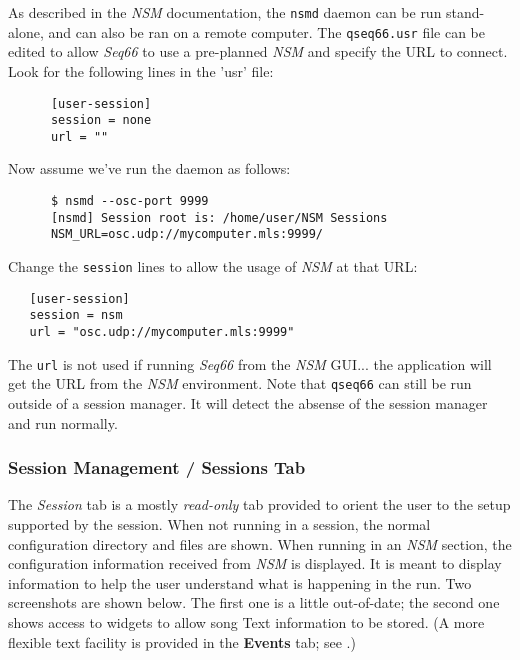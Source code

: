    As described in the \textsl{NSM} documentation, the \texttt{nsmd} daemon can
   be run stand-alone, and can also be ran on a remote computer.
   The \texttt{qseq66.usr} file can be edited to allow \textsl{Seq66} to
   use a pre-planned \textsl{NSM} and specify the URL to connect.
   Look for the following lines in the 'usr' file:

   \begin{verbatim}
      [user-session]
      session = none
      url = ""
   \end{verbatim}

   Now assume we've run the daemon as follows:

   \begin{verbatim}
      $ nsmd --osc-port 9999
      [nsmd] Session root is: /home/user/NSM Sessions
      NSM_URL=osc.udp://mycomputer.mls:9999/
   \end{verbatim}

   Change the \texttt{session} lines to allow the usage of
   \textsl{NSM} at that URL:

\begin{verbatim}
   [user-session]
   session = nsm
   url = "osc.udp://mycomputer.mls:9999"
\end{verbatim}

   The \texttt{url} is not used if running \textsl{Seq66} from the \textsl{NSM}
   GUI... the application will get the URL from the \textsl{NSM} environment.
   Note that \texttt{qseq66} can still be run outside of a
   session manager.  It will detect the absense of the session manager and run
   normally.

\subsubsection{Session Management / Sessions Tab}
\label{subsubsec:sessions_tab}

   The \textsl{Session} tab is a mostly \textsl{read-only} tab
   provided to orient the user to the setup supported by the session.
   When not running in a session, the normal configuration directory and files
   are shown.  When running in an \textsl{NSM} section, the configuration
   information received from \textsl{NSM} is displayed.
   It is meant to display information to
   help the user understand what is happening in the run.
   Two screenshots are shown below.
   The first one is a little out-of-date;
   the second one shows access to widgets to allow
   song Text information to be stored.
   (A more flexible text facility is provided in the \textbf{Events}
   tab; see .)

